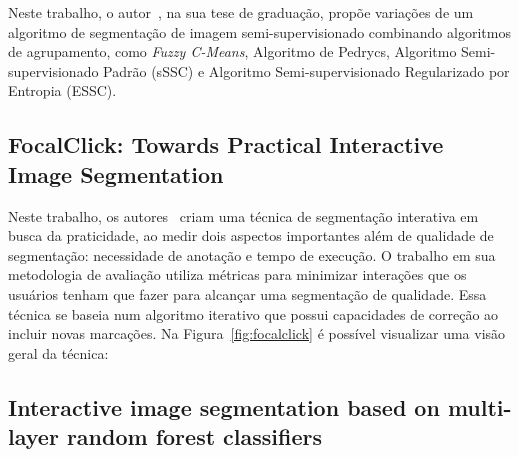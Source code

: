 Neste trabalho, o autor~\cite{franciscolira2018}, na sua tese de
graduação, propõe variações de um algoritmo de segmentação de imagem
semi-supervisionado combinando algoritmos de agrupamento, como
\textit{Fuzzy C-Means}, Algoritmo de Pedrycs, Algoritmo
Semi-supervisionado Padrão (sSSC) e Algoritmo Semi-supervisionado
Regularizado por Entropia (ESSC).

\subsection{FocalClick: Towards Practical Interactive Image Segmentation}\label{sec:focalclick}

Neste trabalho, os autores~\cite{chen2022focalclick} criam uma técnica de
segmentação interativa em busca da praticidade, ao medir dois aspectos
importantes além de qualidade de segmentação: necessidade de anotação
e tempo de execução. O trabalho em sua metodologia de avaliação
utiliza métricas para minimizar interações que os usuários tenham que
fazer para alcançar uma segmentação de qualidade. Essa técnica se
baseia num algoritmo iterativo que possui capacidades de correção ao
incluir novas marcações. Na Figura~\ref{fig:focalclick} é possível visualizar uma
visão geral da técnica:


\begin{figure}[!h]
        \captionsetup{width=12cm}
		\centering
\end{figure}


\subsection{Interactive image segmentation based on multi-layer
random forest classifiers}\label{sec:superpixel-random-forest}

